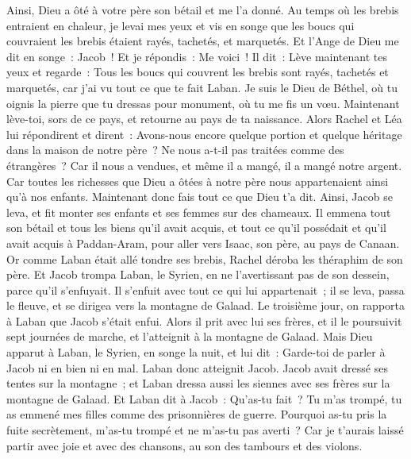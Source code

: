 \begin{multicols}{2}
Ainsi, Dieu a ôté à votre père son bétail et me l'a donné.
Au temps où les brebis entraient en chaleur, je levai mes yeux et vis en songe que les boucs qui couvraient les brebis étaient rayés, tachetés, et marquetés.
Et l'Ange de Dieu me dit en songe~: Jacob~! Et je répondis~: Me voici~!
Il dit~: Lève maintenant tes yeux et regarde~: Tous les boucs qui couvrent les brebis sont rayés, tachetés et marquetés, car j'ai vu tout ce que te fait Laban.
Je suis le Dieu de Béthel, où tu oignis la pierre que tu dressas pour monument, où tu me fis un vœu. Maintenant lève-toi, sors de ce pays, et retourne au pays de ta naissance.
Alors Rachel et Léa lui répondirent et dirent~: Avons-nous encore quelque portion et quelque héritage dans la maison de notre père~?
Ne nous a-t-il pas traitées comme des étrangères~? Car il nous a vendues, et même il a mangé, il a mangé notre argent.
Car toutes les richesses que Dieu a ôtées à notre père nous appartenaient ainsi qu'à nos enfants. Maintenant donc fais tout ce que Dieu t'a dit.
Ainsi, Jacob se leva, et fit monter ses enfants et ses femmes sur des chameaux.
Il emmena tout son bétail et tous les biens qu'il avait acquis, et tout ce qu'il possédait et qu'il avait acquis à Paddan-Aram, pour aller vers Isaac, son père, au pays de Canaan.
Or comme Laban était allé tondre ses brebis, Rachel déroba les théraphim de son père.
Et Jacob trompa Laban, le Syrien, en ne l'avertissant pas de son dessein, parce qu'il s'enfuyait.
Il s'enfuit avec tout ce qui lui appartenait~; il se leva, passa le fleuve, et se dirigea vers la montagne de Galaad.
Le troisième jour, on rapporta à Laban que Jacob s'était enfui.
Alors il prit avec lui ses frères, et il le poursuivit sept journées de marche, et l'atteignit à la montagne de Galaad.
Mais Dieu apparut à Laban, le Syrien, en songe la nuit, et lui dit~: Garde-toi de parler à Jacob ni en bien ni en mal.
Laban donc atteignit Jacob. Jacob avait dressé ses tentes sur la montagne~; et Laban dressa aussi les siennes avec ses frères sur la montagne de Galaad.
Et Laban dit à Jacob~: Qu'as-tu fait~? Tu m'as trompé, tu as emmené mes filles comme des prisonnières de guerre.
Pourquoi as-tu pris la fuite secrètement, m'as-tu trompé et ne m'as-tu pas averti~? Car je t'aurais laissé partir avec joie et avec des chansons, au son des tambours et des violons.

\end{multicols}
